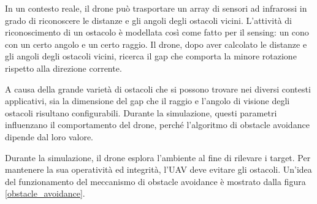 In un contesto reale, il drone può trasportare un array di sensori ad infrarossi in grado di riconoscere le distanze e gli angoli degli ostacoli vicini. 
L’attività di riconoscimento di un ostacolo è modellata così come fatto per il sensing: un cono con un certo angolo e un certo raggio. 
Il drone, dopo aver calcolato le distanze e gli angoli degli ostacoli vicini, ricerca il gap che comporta la minore rotazione rispetto alla direzione corrente.

A causa della grande varietà di ostacoli che si possono trovare nei diversi contesti applicativi, sia la dimensione del gap che il raggio e l’angolo di visione degli ostacoli risultano configurabili. 
Durante la simulazione, questi parametri influenzano il comportamento del drone, perché l’algoritmo di obstacle avoidance dipende dal loro valore.

\begin{table}[H]
    \centering
    \captionsetup{justification=centering, margin=2cm, font=footnotesize}
    \caption{Parametri strutturali del meccanismo di obstacle avoidance.}
    \label{tabella_obstacle_avoidance}
\end{table}

Durante la simulazione, il drone esplora l'ambiente al fine di rilevare i target.
Per mantenere la sua operatività ed integrità, l'UAV deve evitare gli ostacoli.
Un'idea del funzionamento del meccanismo di obstacle avoidance è mostrato dalla figura \ref{obstacle_avoidance}.

